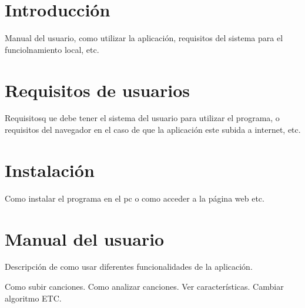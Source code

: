 
\section{Introducción}

Manual del usuario, como utilizar la aplicación, requisitos del sistema para el funciolnamiento local, etc.

\section{Requisitos de usuarios}

Requisitosq ue debe tener el sistema del usuario para utilizar el programa, o requisitos del navegador en el caso de que la aplicación este subida a internet, etc.

\section{Instalación}

Como instalar el programa en el pc o como acceder a la página web etc.

\section{Manual del usuario}
Descripción de como usar diferentes funcionalidades de la aplicación.

Como subir canciones.
Como analizar canciones.
Ver características.
Cambiar algoritmo
ETC.